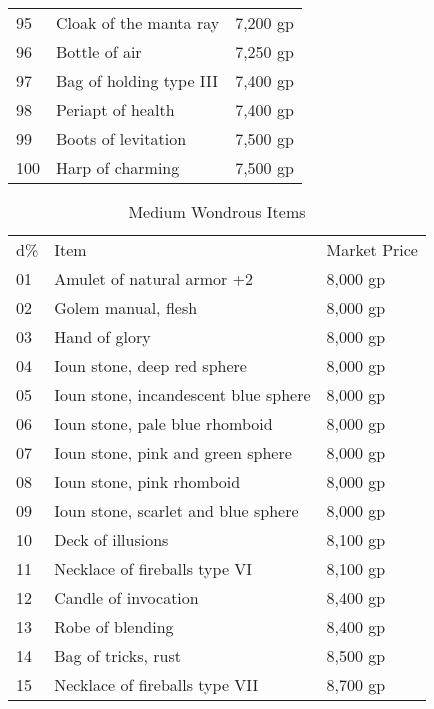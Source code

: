 \begin{table}[]
\begin{tabular}{lll}
95  & Cloak of the manta ray                      & 7,200 gp     \\
96  & Bottle of air                               & 7,250 gp     \\
97  & Bag of holding type III                     & 7,400 gp     \\
98  & Periapt of health                           & 7,400 gp     \\
99  & Boots of levitation                         & 7,500 gp     \\
100 & Harp of charming                            & 7,500 gp    
\end{tabular}
\end{table}

\begin{table}[]
\sffamily
\caption{Medium Wondrous Items}
\begin{tabular}{lll}
d\% & Item                                        & Market Price \\
01  & Amulet of natural armor +2                  & 8,000 gp     \\
02  & Golem manual, flesh                         & 8,000 gp     \\
03  & Hand of glory                               & 8,000 gp     \\
04  & Ioun stone, deep red sphere                 & 8,000 gp     \\
05  & Ioun stone, incandescent blue sphere        & 8,000 gp     \\
06  & Ioun stone, pale blue rhomboid              & 8,000 gp     \\
07  & Ioun stone, pink and green sphere           & 8,000 gp     \\
08  & Ioun stone, pink rhomboid                   & 8,000 gp     \\
09  & Ioun stone, scarlet and blue sphere         & 8,000 gp     \\
10  & Deck of illusions                           & 8,100 gp     \\
11  & Necklace of fireballs type VI               & 8,100 gp     \\
12  & Candle of invocation                        & 8,400 gp     \\
13  & Robe of blending                            & 8,400 gp     \\
14  & Bag of tricks, rust                         & 8,500 gp     \\
15  & Necklace of fireballs type VII              & 8,700 gp     \\

\end{tabular}
\end{table}
